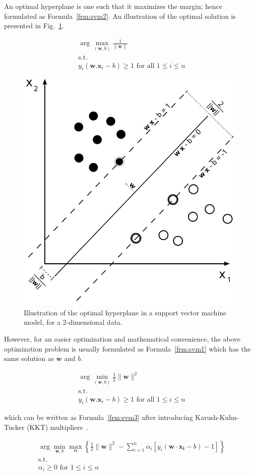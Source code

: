 An optimal hyperplane is one such that it maximizes the margin; hence formulated as Formula~\ref{frm:svm2}. An illustration of the optimal solution is presented in Fig.~\ref{fig:svm-hyperplane}.

\begin{align}
  &\arg\max_{(\mathbf{w},b)}\frac{1}{\|\mathbf{w}\|} \nonumber \\
  &\text{s.t.} \nonumber \\
  &y_i (\mathbf{w} . \mathbf{x}_i - b)\geq 1 \text{ for all } 1 \leq i \leq n
  \label{frm:svm2}
\end{align}

\begin{figure}[!ht]
  \centering
  \includegraphics[width=.5\textwidth]{figs/background/Svm_max_sep_hyperplane_with_margin}
  \caption{Illustration of the optimal hyperplane in a support vector machine model, for a 2-dimensional data.}
  \label{fig:svm-hyperplane}
\end{figure}

However, for an easier optimization and mathematical convenience, the above optimization problem is usually formulated as Formula~\ref{frm:svm1} which has the same solution as $\mathbf{w}$ and $b$.

\begin{align}
  &\arg\min_{(\mathbf{w},b)}\frac{1}{2}\|\mathbf{w}\|^2 \nonumber \\
  &\text{s.t.} \nonumber \\
  &y_i (\mathbf{w} . \mathbf{x}_i - b)\geq 1 \text{ for all } 1 \leq i \leq n
  \label{frm:svm1}
\end{align}

which can be written as Formula~\ref{frm:svm3} after introducing Karush-Kuhn-Tucker (KKT) multipliers~\cite{kkt-orig}.

\begin{align}
  &\arg\min_{\mathbf{w},b } \max_{\boldsymbol{\alpha}} \left\{ \frac{1}{2}\|\mathbf{w}\|^2 - \sum_{i=1}^{n}{\alpha_i[y_i(\mathbf{w}\cdot \mathbf{x_i} - b)-1]} \right\} \nonumber \\
  &\text{s.t.} \nonumber \\
  &\alpha_i \geq 0 \text{ for } 1 \leq i \leq n \nonumber \\
  \label{frm:svm3}
\end{align}

